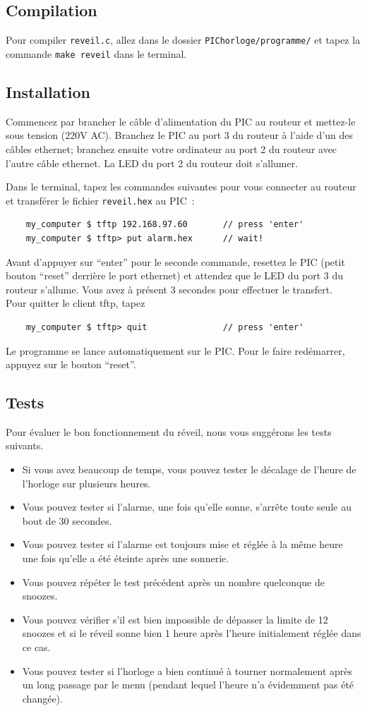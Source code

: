 \documentclass[12pt,a4paper]{article}
\begin{document}
\subsection{Compilation}
Pour compiler \texttt{reveil.c}, allez dans le dossier \texttt{PIChorloge/programme/} et tapez la commande \texttt{make reveil} dans le terminal.

\subsection{Installation}
Commencez par brancher le câble d'alimentation du PIC au routeur et mettez-le sous tension (220V AC). Branchez le PIC au port 3 du routeur à l'aide d'un des câbles ethernet; branchez ensuite votre ordinateur au port 2 du routeur avec l'autre câble ethernet. La LED du port 2 du routeur doit s'allumer.

Dans le terminal, tapez les commandes suivantes pour vous connecter au routeur et transférer le fichier \texttt{reveil.hex} au PIC~:
\begin{verbatim}
    my_computer $ tftp 192.168.97.60       // press 'enter'
    my_computer $ tftp> put alarm.hex      // wait!
\end{verbatim}
Avant d'appuyer sur ``enter'' pour le seconde commande, resettez le PIC (petit bouton ``reset'' derrière le port ethernet) et attendez que le LED du port 3 du routeur s'allume. Vous avez à présent 3 secondes pour effectuer le transfert.\\
Pour quitter le client tftp, tapez
\begin{verbatim}
    my_computer $ tftp> quit               // press 'enter'
\end{verbatim}
Le programme se lance automatiquement sur le PIC. Pour le faire redémarrer, appuyez sur le bouton ``reset''.

\subsection{Tests}
Pour évaluer le bon fonctionnement du réveil, nous vous suggérons les tests suivants.
\begin{itemize}
\item Si vous avez beaucoup de temps, vous pouvez tester le décalage de l'heure de l'horloge sur plusieurs heures. 
\item Vous pouvez tester si l'alarme, une fois qu'elle sonne, s'arrête toute seule au bout de 30 secondes.
\item Vous pouvez tester si l'alarme est toujours mise et réglée à la même heure une fois qu'elle a été éteinte après une sonnerie.
\item Vous pouvez répéter le test précédent après un nombre quelconque de snoozes.
\item Vous pouvez vérifier s'il est bien impossible de dépasser la limite de 12 snoozes et si le réveil sonne bien 1 heure après l'heure initialement réglée dans ce cas.
\item Vous pouvez tester si l'horloge a bien continué à tourner normalement après un long passage par le menu (pendant lequel l'heure n'a évidemment pas été changée).
\end{itemize}
\end{document}
